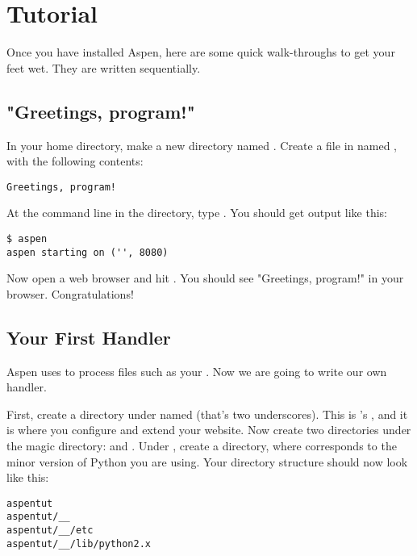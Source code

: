 \chapter{Tutorial \label{tutorial}}

Once you have installed Aspen, here are some quick walk-throughs to get your
feet wet. They are written sequentially.


\section{"Greetings, program!" \label{tutorial-greetings-program}}

In your home directory, make a new directory named . Create a
file in  named , with the following contents:

\begin{verbatim}
Greetings, program!
\end{verbatim}

At the command line in the  directory, type . You
should get output like this:

\begin{verbatim}
$ aspen
aspen starting on ('', 8080)
\end{verbatim}

Now open a web browser and hit . You should see
"Greetings, program!" in your browser. Congratulations!


\section{Your First Handler \label{tutorial-handler}}

Aspen uses  to process files such as your . Now
we are going to write our own handler.

First, create a directory under  named \file{__} (that's two
underscores). This is 's , and it is where
you configure and extend your website. Now create two directories under the
magic directory:  and . Under , create a
 directory, where  corresponds to the minor version of
Python you are using. Your directory structure should now look like this:

\begin{verbatim}
aspentut
aspentut/__
aspentut/__/etc
aspentut/__/lib/python2.x
\end{verbatim}

